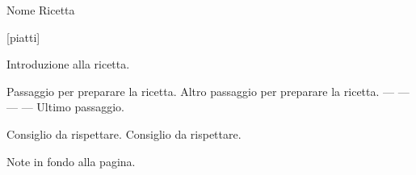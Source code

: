 \begin{recipe}[label=template]{Nome Ricetta}
    \begin{header}
        [piatti]

    \end{header}

    \begin{introduction}
        Introduzione alla ricetta.
    \end{introduction}

    \begin{ingredients}
        
        
    \end{ingredients}

    \begin{preparation}
        \step Passaggio per preparare la ricetta.
        \step Altro passaggio per preparare la ricetta.
        \step* --- --- --- ---
        \step Ultimo passaggio.
    \end{preparation}

    \begin{suggestion}[2cm]
        \suggestionMark Consiglio da rispettare.
        \suggestionMark Consiglio da rispettare.
    \end{suggestion}

    \begin{hint}
        Note in fondo alla pagina.
    \end{hint}
\end{recipe}
